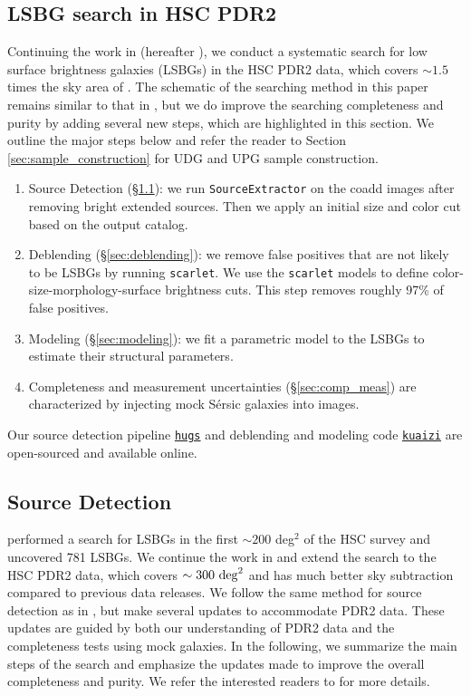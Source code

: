 \documentclass[twocolumn,astrosymb,twocolappendix]{aastex631}
\newcommand{\code}[1]{\texttt{#1}}
\newcommand{\sersic}{S\'ersic}
\begin{document}
\begin{CJK*}{UTF8}{gbsn}
\section{LSBG search in HSC PDR2}\label{sec:lsbg_search}
Continuing the work in \citet{Greco2018} (hereafter ), we conduct a systematic search for low surface brightness galaxies (LSBGs) in the HSC PDR2 data, which covers $\sim 1.5$ times the sky area of . The schematic of the searching method in this paper remains similar to that in , but we do improve the searching completeness and purity by adding several new steps, which are highlighted in this section. We outline the major steps below and refer the reader to Section \ref{sec:sample_construction} for UDG and UPG sample construction.
\begin{enumerate}
    \item Source Detection (\S \ref{sec:detection}): we run \code{SourceExtractor} on the coadd images after removing bright extended sources. Then we apply an initial size and color cut based on the output catalog. 
    \item Deblending (\S \ref{sec:deblending}): we remove false positives that are not likely to be LSBGs by running \code{scarlet}. We use the \code{scarlet} models to define color-size-morphology-surface brightness cuts. This step removes roughly 97\% of false positives.
    \item Modeling (\S \ref{sec:modeling}): we fit a parametric model to the LSBGs to estimate their structural parameters. 
    \item Completeness and measurement uncertainties (\S \ref{sec:comp_meas}) are characterized by injecting mock \sersic{} galaxies into images. 
\end{enumerate}
Our source detection pipeline \href{https://github.com/johnnygreco/hugs}{\code{hugs}} and deblending and modeling code \href{https://github.com/AstroJacobLi/kuaizi}{\code{kuaizi}} are open-sourced and available online.

\subsection{Source Detection}\label{sec:detection}
 performed a search for LSBGs in the first $\sim 200$ deg$^2$ of the HSC survey and uncovered 781 LSBGs. We continue the work in  and extend the search to the HSC PDR2 data, which covers $\sim 300\ \rm{deg}^{2}$ and has much better sky subtraction compared to previous data releases. We follow the same method for source detection as in , but make several updates to accommodate PDR2 data. These updates are guided by both our understanding of PDR2 data and the completeness tests using mock galaxies. In the following, we summarize the main steps of the search and emphasize the updates made to improve the overall completeness and purity. We refer the interested readers to  for more details. 


\end{CJK*}
\end{document}
